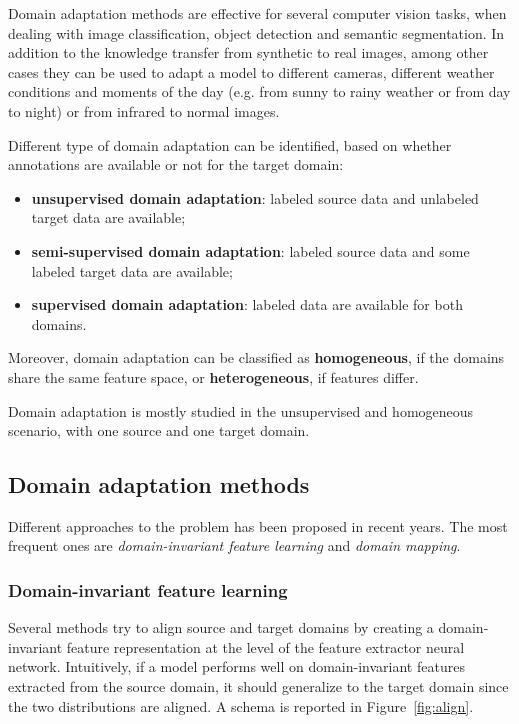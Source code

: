 \documentclass[%
    corpo=12pt,
    twoside,
    stile=classica,   
    tipotesi=magistrale,
    evenboxes,
    english,
	numerazioneromana,
]{toptesi}
\begin{document}
Domain adaptation methods are effective for several computer vision tasks, when dealing with image classification, object detection and semantic segmentation. In addition to the knowledge transfer from synthetic to real images, among other cases they can be used to adapt a model to different cameras, different weather conditions and moments of the day (e.g. from sunny to rainy weather or from day to night) or from infrared to normal images.

Different type of domain adaptation can be identified, based on whether an\-no\-ta\-tions are available or not for the target domain:

\begin{itemize}
	\item \textbf{unsupervised domain adaptation}: labeled source data and unlabeled target data are available;
	\item \textbf{semi-supervised domain adaptation}: labeled source data and some labeled target data are available;
	\item \textbf{supervised domain adaptation}: labeled data are available for both domains.
\end{itemize}
Moreover, domain adaptation can be classified as \textbf{homogeneous}, if the domains share the same feature space, or \textbf{heterogeneous}, if features differ.

Domain adaptation is mostly studied in the unsupervised and homogeneous scenario, with one source and one target domain.

\subsection{Domain adaptation methods}
Different approaches to the problem has been proposed in recent years. The most frequent ones are \textit{domain-invariant feature learning} and \textit{domain mapping}.

\subsubsection{Domain-invariant feature learning}
Several methods try to align source and target domains by creating a domain-invariant feature representation at the level of the feature extractor neural network. Intuitively, if a model performs well on domain-invariant features extracted from the source domain, it should generalize to the target domain since the two distributions are aligned. A schema is reported in Figure~\ref{fig:align}.
\end{document}
